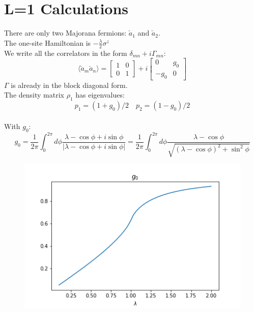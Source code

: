 \documentclass[10pt,a4paper]{article}
\begin{document}
\section{L=1 Calculations}
There are only two Majorana fermions: $\check{a}_1$ and $\check{a}_2$.\\
The one-site Hamiltonian is $-\frac{\lambda}{2}\sigma^z$\\
We write all the correlators in the form $\delta_{m n}+i\Gamma_{m n}$:
\begin{equation}
	\langle\check{a}_{m} \check{a}_{n}\rangle= \left[\begin{array}{cc}
		1 & 0 \\
		0 & 1
	\end{array}\right]+i\left[\begin{array}{cc}
	0 & g_0 \\
	-g_0 & 0
\end{array}\right]
\end{equation}
$\Gamma$ is already in the block diagonal form.\\
The density matrix $\rho_1$ has eigenvalues:
\begin{equation}
	p_1=(1+g_0)/2 \quad p_2=(1-g_0)/2
\end{equation}\\
With $g_0$:
\begin{equation}
	g_0=\frac{1}{2 \pi} \int_{0}^{2 \pi} d \phi \frac{\lambda-\cos \phi+i \sin \phi}{|\lambda-\cos\phi +i  \sin \phi|}=\frac{1}{2 \pi} \int_{0}^{2 \pi} d \phi \frac{\lambda-\cos \phi}{\sqrt{(\lambda-\cos\phi)^2 +  \sin^2 \phi}}
\end{equation}
\begin{figure}[h!]
	\centering
	\includegraphics[width=0.7\linewidth]{g0}
	\caption{}
	\label{fig:g0}
\end{figure}\\
\end{document}
